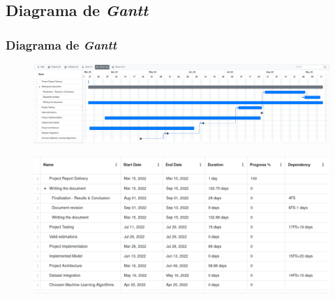 \documentclass{beamer}
\begin{document}
\subsection{Diagrama de \textit{Gantt}}
\begin{frame}
\frametitle{Diagrama de \textit{Gantt}}

\begin{center}
	\begin{figure}[H]
		\begin{center}
			\includegraphics[scale=0.16]{./figures/planning_tiny1.pdf}
		\end{center}
	\end{figure}
\end{center}


\begin{figure}[H]
    \begin{center}
        \includegraphics[scale=0.20]{./figures/planning_tiny2.pdf}
    \end{center}
\end{figure}

\end{frame}

\begin{frame}
	
	\vspace{1cm}
	\centering {}

\end{frame}
\end{document}
